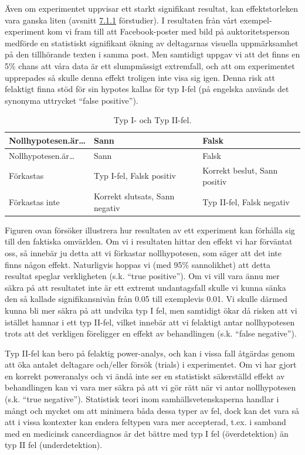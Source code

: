 \documentclass[
]{book}
\begin{document}
Även om experimentet uppvisar ett starkt signifikant resultat, kan effektstorleken vara ganska liten (avsnitt \protect\hyperlink{sub07.1.1}{7.1.1} förstudier). I resultaten från vårt exempel-experiment kom vi fram till att Facebook-poster med bild på auktoritetsperson medförde en statistiskt signifikant ökning av deltagarnas visuella uppmärksamhet på den tillhörande texten i samma post. Men samtidigt uppgav vi att det finns en 5\% chans att våra data är ett slumpmässigt extremfall, och att om experimentet upprepades så skulle denna effekt troligen inte visa sig igen. Denna risk att felaktigt finna stöd för sin hypotes kallas för typ I-fel (på engelska används det synonyma uttrycket ``false positive'').

\begin{longtable}[]{@{}lll@{}}
\caption{\label{tab:tab-02-08-2-1-01}Typ I- och Typ II-fel.}\tabularnewline
\toprule
Nollhypotesen.är\ldots{} & Sann & Falsk\tabularnewline
\midrule
\endfirsthead
\toprule
Nollhypotesen.är\ldots{} & Sann & Falsk\tabularnewline
\midrule
\endhead
Förkastas & Typ I-fel, Falsk positiv & Korrekt beslut, Sann positiv\tabularnewline
Förkastas inte & Korrekt slutsats, Sann negativ & Typ II-fel, Falsk negativ\tabularnewline
\bottomrule
\end{longtable}

Figuren ovan försöker illustrera hur resultaten av ett experiment kan förhålla sig till den faktiska omvärlden. Om vi i resultaten hittar den effekt vi har förväntat oss, så innebär ju detta att vi förkastar nollhypotesen, som säger att det inte finns någon effekt. Naturligvis hoppas vi (med 95\% sannolikhet) att detta resultat speglar verkligheten (s.k. ``true positive''). Om vi vill vara ännu mer säkra på att resultatet inte är ett extremt undantagsfall skulle vi kunna sänka den så kallade signifikansnivån från 0.05 till exemplevis 0.01. Vi skulle därmed kunna bli mer säkra på att undvika typ I fel, men samtidigt ökar då risken att vi istället hamnar i ett typ II-fel, vilket innebär att vi felaktigt antar nollhypotesen trots att det verkligen föreligger en effekt av behandlingen (s.k. ``false negative'').

Typ II-fel kan bero på felaktig power-analys, och kan i vissa fall åtgärdas genom att öka antalet deltagare och/eller försök (trials) i experimentet. Om vi har gjort en korrekt poweranalys och vi ändå inte ser en statistiskt säkerställd effekt av behandlingen kan vi vara mer säkra på att vi gör rätt när vi antar nollhypotesen (s.k. ``true negative''). Statistisk teori inom samhällsvetenskaperna handlar i mångt och mycket om att minimera båda dessa typer av fel, dock kan det vara så att i vissa kontexter kan endera feltypen vara mer accepterad, t.ex. i samband med en medicinsk cancerdiagnos är det bättre med typ I fel (överdetektion) än typ II fel (underdetektion).
\end{document}
